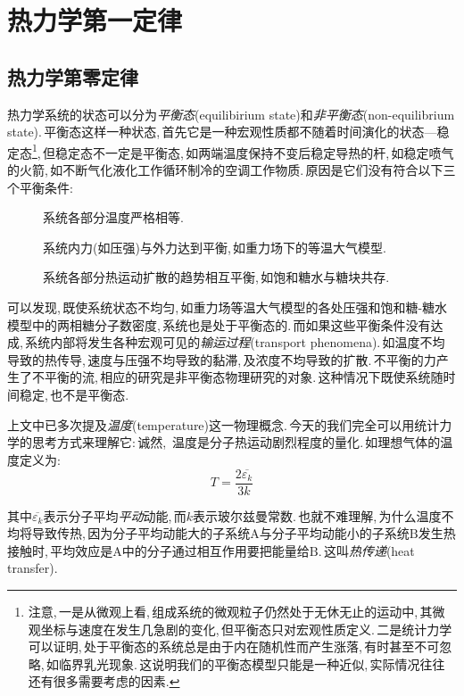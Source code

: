 \chapter{热力学第一定律}


\section{热力学第零定律}
热力学系统的状态可以分为\emph{平衡态}(equilibirium state)和\emph{非平衡态}(non-equilibrium state).\,平衡态这样一种状态,\,首先它是一种宏观性质都不随着时间演化的状态---稳定态\footnote{注意,\,一是从微观上看,\,组成系统的微观粒子仍然处于无休无止的运动中,\,其微观坐标与速度在发生几急剧的变化,\,但平衡态只对宏观性质定义.\,二是统计力学可以证明,\,处于平衡态的系统总是由于内在随机性而产生涨落,\,有时甚至不可忽略,\,如临界乳光现象.\,这说明我们的平衡态模型只能是一种近似,\,实际情况往往还有很多需要考虑的因素.},\,但稳定态不一定是平衡态,\,如两端温度保持不变后稳定导热的杆,\,如稳定喷气的火箭,\,如不断气化液化工作循环制冷的空调工作物质.\,原因是它们没有符合以下三个平衡条件:
\begin{description}
	\item[\quad {}]	系统各部分温度严格相等.
	\item[\quad {}]	系统内力(如压强)与外力达到平衡,\,如重力场下的等温大气模型.
	\item[\quad {}] 	系统各部分热运动扩散的趋势相互平衡,\,如饱和糖水与糖块共存.
\end{description}

可以发现,\,既使系统状态不均匀,\,如重力场等温大气模型的各处压强和饱和糖-糖水模型中的两相糖分子数密度,\,系统也是处于平衡态的.\,而如果这些平衡条件没有达成,\,系统内部将发生各种宏观可见的\emph{输运过程}(transport phenomena).\,如温度不均导致的热传导,\,速度与压强不均导致的黏滞,\,及浓度不均导致的扩散.\,不平衡的力产生了不平衡的流,\,相应的研究是非平衡态物理研究的对象.\,这种情况下既使系统随时间稳定,\,也不是平衡态.

上文中已多次提及\emph{温度}(temperature)这一物理概念.\,今天的我们完全可以用统计力学的思考方式来理解它:\,诚然,\,{ 温度是分子热运动剧烈程度的量化}.\,如理想气体的温度定义为:
\[T=\frac{2\overline{\varepsilon_k}}{3k}\]

其中$\overline{\varepsilon_k}$表示分子平均\emph{平动}动能,\,而$k$表示玻尔兹曼常数.\,也就不难理解,\,为什么温度不均将导致传热,\,因为分子平均动能大的子系统$\mathrm{A}$与分子平均动能小的子系统$\mathrm{B}$发生热接触时,\,平均效应是$\mathrm{A}$中的分子通过相互作用要把能量给$\mathrm{B}$.\,这叫\emph{热传递}(heat transfer).

